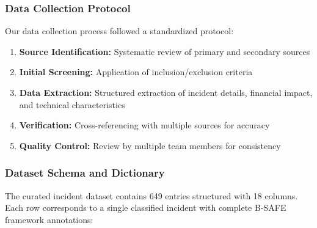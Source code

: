 \subsubsection{Data Collection Protocol}
Our data collection process followed a standardized protocol:
\begin{enumerate}
    \item \textbf{Source Identification:} Systematic review of primary and secondary sources
    \item \textbf{Initial Screening:} Application of inclusion/exclusion criteria
    \item \textbf{Data Extraction:} Structured extraction of incident details, financial impact, and technical characteristics
    \item \textbf{Verification:} Cross-referencing with multiple sources for accuracy
    \item \textbf{Quality Control:} Review by multiple team members for consistency
\end{enumerate}

\subsubsection{Dataset Schema and Dictionary}

The curated incident dataset contains 649 entries structured with 18 columns. Each row corresponds to a single classified incident with complete B-SAFE framework annotations:

